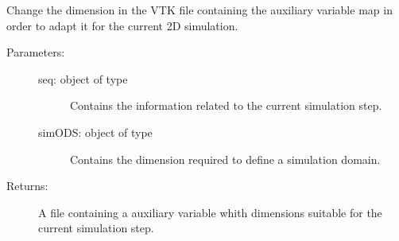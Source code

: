 \documentclass[letterpaper,10pt,english]{sphinxmanual}
\begin{document}

\begin{fulllineitems}
\label{\detokenize{appendices:s2Dcd.s2Dcd.adaptAuxVarFile}}
Change the dimension in the VTK file containing the auxiliary
variable map in order to adapt it for the current 2D simulation.
\begin{description}
\item[{Parameters:}] \leavevmode\begin{description}
\item[{seq: object of type {\hyperref[\detokenize{appendices:s2Dcd.s2Dcd.SeqStep}]{}}}] \leavevmode
Contains the information related to the current simulation
step.

\item[{simODS: object of type }] \leavevmode
Contains the dimension required to define a simulation domain.

\end{description}

\item[{Returns:}] \leavevmode
A file containing a auxiliary variable whith dimensions
suitable for the current simulation step.

\end{description}

\end{fulllineitems}

\end{document}
